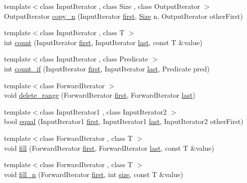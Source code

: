 \begin{DoxyCompactItemize}
\item 
{\footnotesize template$<$class Input\+Iterator , class Size , class Output\+Iterator $>$ }\\Output\+Iterator \hyperlink{namespaceprism_af907f3f5637d4ec056e9b833b6272953}{copy\+\_\+n} (Input\+Iterator \hyperlink{namespaceprism_ae3fb7a1926a9e8e59300cd5e370470da}{first}, \hyperlink{classprism_1_1_size}{Size} n, Output\+Iterator other\+First)
\item 
{\footnotesize template$<$class Input\+Iterator , class T $>$ }\\int \hyperlink{namespaceprism_a024117fc3639cdf6598509edf22f034a}{count} (Input\+Iterator \hyperlink{namespaceprism_ae3fb7a1926a9e8e59300cd5e370470da}{first}, Input\+Iterator \hyperlink{namespaceprism_abe4956c4e865f55ca126b7fb973b5078}{last}, const T \&value)
\item 
{\footnotesize template$<$class Input\+Iterator , class Predicate $>$ }\\int \hyperlink{namespaceprism_af0007d361beae18a930b6249752e509e}{count\+\_\+if} (Input\+Iterator \hyperlink{namespaceprism_ae3fb7a1926a9e8e59300cd5e370470da}{first}, Input\+Iterator \hyperlink{namespaceprism_abe4956c4e865f55ca126b7fb973b5078}{last}, Predicate pred)
\item 
{\footnotesize template$<$class Forward\+Iterator $>$ }\\void \hyperlink{namespaceprism_a83e62e5b148c55f949e5ea843d53ad67}{delete\+\_\+range} (Forward\+Iterator \hyperlink{namespaceprism_ae3fb7a1926a9e8e59300cd5e370470da}{first}, Forward\+Iterator \hyperlink{namespaceprism_abe4956c4e865f55ca126b7fb973b5078}{last})
\item 
{\footnotesize template$<$class Input\+Iterator1 , class Input\+Iterator2 $>$ }\\bool \hyperlink{namespaceprism_ad3bede9a0f2c648e93677b14c45b1b7b}{equal} (Input\+Iterator1 \hyperlink{namespaceprism_ae3fb7a1926a9e8e59300cd5e370470da}{first}, Input\+Iterator1 \hyperlink{namespaceprism_abe4956c4e865f55ca126b7fb973b5078}{last}, Input\+Iterator2 other\+First)
\item 
{\footnotesize template$<$class Forward\+Iterator , class T $>$ }\\void \hyperlink{namespaceprism_a7c33653a5b4a07b31f5bde15e9085b45}{fill} (Forward\+Iterator \hyperlink{namespaceprism_ae3fb7a1926a9e8e59300cd5e370470da}{first}, Forward\+Iterator \hyperlink{namespaceprism_abe4956c4e865f55ca126b7fb973b5078}{last}, const T \&value)
\item 
{\footnotesize template$<$class Forward\+Iterator , class T $>$ }\\void \hyperlink{namespaceprism_aceb4b9c511a5edb706296b457427b226}{fill\+\_\+n} (Forward\+Iterator \hyperlink{namespaceprism_ae3fb7a1926a9e8e59300cd5e370470da}{first}, int \hyperlink{namespaceprism_acd3c0f96adf158a29387191d79c4d874}{size}, const T \&value)

\end{DoxyCompactItemize}
